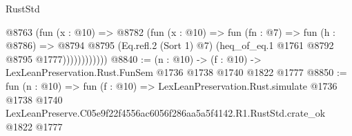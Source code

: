 \begin{lexlean}{RustStd}
\begin{coremodule}
                    @8763
                      (fun (x : @10) =>
                      @8782
                        (fun (x : @10) =>
                        fun (fn : @7) =>
                        fun (h : @8786) =>
                        @8794
                          @8795
                          (Eq.refl.{2} (Sort 1) @7)
                          (heq_of_eq.{1} @1761 @8792 @8795 @1777))))))))))))
@8840 := (n : @10) -> (f : @10) -> LexLeanPreservation.Rust.FunSem @1736 @1738 @1740 @1822 @1777
@8850 := fun (n : @10) =>
  fun (f : @10) =>
  LexLeanPreservation.Rust.simulate
    @1736
    @1738
    @1740
    LexLeanPreserve.C05e9f22f4556ac6056f286aa5a5f4142.R1.RustStd.crate_ok
    @1822
    @1777
\end{coremodule}
\end{lexlean}
